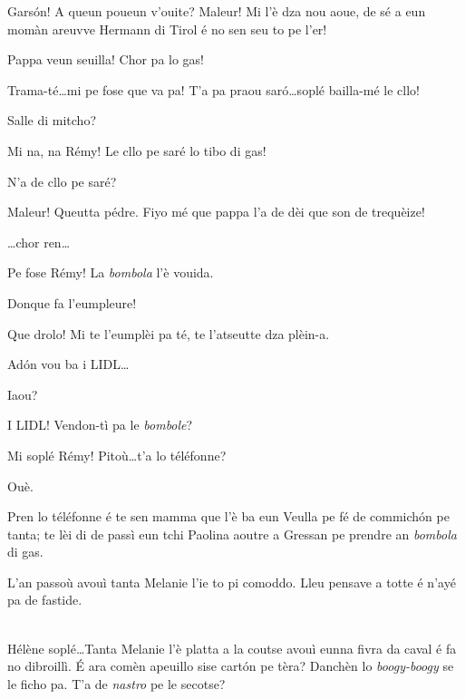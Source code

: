 \begin{drama}

\Cesarspeaks{} Gars\'on! A queun poueun v'ouite? Maleur! Mi l'è dza nou aoue, de sé a eun momàn areuvve Hermann di Tirol é no sen seu to pe l'er!

\Remyspeaks Pappa veun seuilla! Chor pa lo gas! 

\Cesarspeaks{} Trama-té\ldots mi pe fose que va pa! T'a pa praou sar\'o\ldots soplé bailla-mé le cllo!

\Remyspeaks Salle di mitcho?

\Cesarspeaks{} Mi na, na Rémy! Le cllo pe saré lo tibo di gas!

\Remyspeaks N'a de cllo pe saré?

\Cesarspeaks Maleur! Queutta pédre. Fiyo mé que pappa l'a de dèi que son de trequèize!


\Cesarspeaks \ldots chor ren\ldots


\Cesarspeaks  Pe fose Rémy! La \textit{bombola} l’è vouida. 

\Remyspeaks Donque fa l'eumpleure!

\Cesarspeaks{} Que drolo! Mi te l'eumplèi pa té, te l'atseutte dza plèin-a.

\Remyspeaks Ad\'on vou ba i LIDL\ldots

\Cesarspeaks Iaou?

\Remyspeaks I LIDL! Vendon-tì pa le \textit{bombole}?

\Cesarspeaks Mi soplé Rémy! Pitoù\ldots t'a lo téléfonne?

\Remyspeaks Ouè.

\Cesarspeaks Pren lo téléfonne é te sen mamma que l'è ba eun Veulla pe fé de commich\'on pe tanta; te lèi di de passì eun tchi Paolina aoutre a Gressan pe prendre an \textit{bombola} di gas.

\Helenespeaks L’an passoù avouì tanta Melanie l’ie to pi comoddo. Lleu pensave a totte é n'ayé pa de fastide.

\Cesarspeaks {}\\ Hélène soplé\ldots Tanta Melanie l’è platta a la coutse avouì eunna fivra da caval é fa no dibroillì.  É ara comèn apeuillo sise cart\'on pe tèra? Danchèn lo \textit{boogy-boogy} se le ficho pa.  T’a de \textit{nastro} pe le secotse?


\end{drama}
